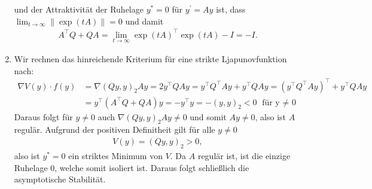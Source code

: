 \begin{solution}
\begin{enumerate}[label = \textbf{\alph*)}]
  und der Attraktivität der Ruhelage $y^* = 0$ für $y^{\prime} = Ay$
  ist, dass $\lim_{t \to \infty}\|\exp(tA)\| = 0$ und damit
  \begin{align*}
    A^{\top}Q + QA = \lim_{t \to \infty} \exp(tA)^{\top}\exp(tA) - I = -I.
  \end{align*}
  \item Wir rechnen das hinreichende Kriterium für eine strikte Ljapunovfunktion nach:
  \begin{align*}
    \nabla V(y) \cdot f(y) &= \nabla (Qy,y)_2 Ay = 2y^{\top}Q Ay =
    y^{\top}Q^{\top} Ay + y^{\top}Q Ay = (y^{\top}Q^{\top} Ay)^{\top} + y^{\top}Q Ay\\
    &= y^{\top}(A^{\top}Q + QA)y = - y^{\top}y = -(y,y)_2 < 0 \text{ für y $\neq$ 0}
  \end{align*}
  Daraus folgt für $y \neq 0$ auch $\nabla (Qy,y)_2 Ay \neq 0$ und somit $Ay \neq 0$,
  also ist $A$ regulär.
  Aufgrund der positiven Definitheit gilt für alle $y \neq 0$
  \begin{align*}
    V(y) = (Qy,y)_2 > 0,
  \end{align*}
  also ist $y^* = 0$ ein striktes Minimum von $V$.
  Da $A$ regulär ist, ist die einzige Ruhelage $0$, welche somit isoliert ist.
  Daraus folgt schließlich die asymptotische Stabilität.
\end{enumerate}
\end{solution}
